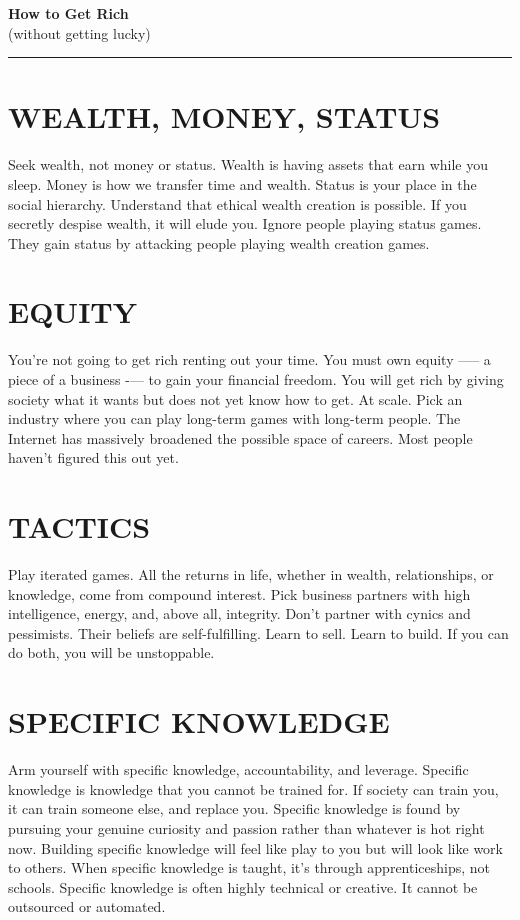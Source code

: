 \documentclass[a4paper,10pt]{article}
\begin{document}
\noindent
\begin{flushright}
    \textbf{\Large\color{burgundy} How to Get Rich} \\[0.5em] 
    {\small\color{black} (without getting lucky)}
\end{flushright}

\noindent\rule{\textwidth}{0.4pt}

\section{WEALTH, MONEY, STATUS}
Seek wealth, not money or status. Wealth is having assets that earn while you sleep. Money is how we transfer time and wealth. Status is your place in the social hierarchy. Understand that ethical wealth creation is possible. If you secretly despise wealth, it will elude you. Ignore people playing status games. They gain status by attacking people playing wealth creation games.

\section{EQUITY}
You're not going to get rich renting out your time. You must own equity —-- a piece of a business -— to gain your financial freedom. You will get rich by giving society what it wants but does not yet know how to get. At scale. Pick an industry where you can play long-term games with long-term people. The Internet has massively broadened the possible space of careers. Most people haven't figured this out yet.

\section{TACTICS}
Play iterated games. All the returns in life, whether in wealth, relationships, or knowledge, come from compound interest. Pick business partners with high intelligence, energy, and, above all, integrity. Don't partner with cynics and pessimists. Their beliefs are self-fulfilling. Learn to sell. Learn to build. If you can do both, you will be unstoppable.

\section{SPECIFIC KNOWLEDGE}
Arm yourself with specific knowledge, accountability, and leverage. Specific knowledge is knowledge that you cannot be trained for. If society can train you, it can train someone else, and replace you. Specific knowledge is found by pursuing your genuine curiosity and passion rather than whatever is hot right now. Building specific knowledge will feel like play to you but will look like work to others. When specific knowledge is taught, it's through apprenticeships, not schools. Specific knowledge is often highly technical or creative. It cannot be outsourced or automated.
\end{document}
